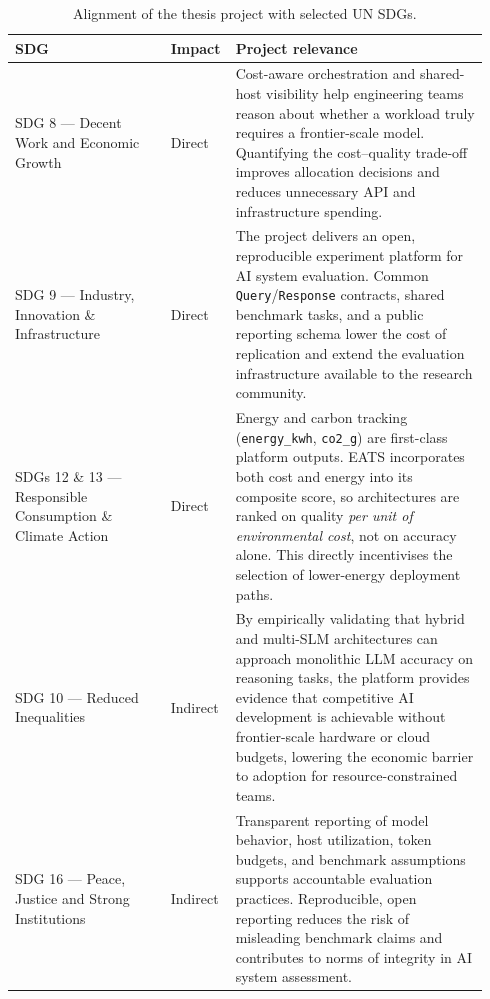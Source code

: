 \begin{table}[htbp]
    \centering
    \caption{Alignment of the thesis project with selected UN SDGs.}
    \small
    \renewcommand{\arraystretch}{1.12}
    \begin{tabularx}{\linewidth}{@{} >{\raggedright\arraybackslash}p{0.32\linewidth} >{\raggedright\arraybackslash}p{0.10\linewidth} >{\raggedright\arraybackslash}p{0.52\linewidth} @{}}
        \toprule
        \textbf{SDG} & \textbf{Impact} & \textbf{Project relevance} \\
        \midrule
        SDG 8 --- Decent Work and Economic Growth
            & Direct
            & Cost-aware orchestration and shared-host visibility help engineering teams reason
              about whether a workload truly requires a frontier-scale model.
              Quantifying the cost--quality trade-off improves allocation decisions and reduces
              unnecessary API and infrastructure spending. \\
        \addlinespace
        SDG 9 --- Industry, Innovation \& Infrastructure
            & Direct
            & The project delivers an open, reproducible experiment platform for AI system evaluation.
              Common \texttt{Query}/\texttt{Response} contracts, shared benchmark tasks, and a
              public reporting schema lower the cost of replication and extend the evaluation
              infrastructure available to the research community. \\
        \addlinespace
        SDGs 12 \& 13 --- Responsible Consumption \& Climate Action
            & Direct
            & Energy and carbon tracking (\texttt{energy\_kwh}, \texttt{co2\_g}) are first-class
              platform outputs.
              EATS incorporates both cost and energy into its composite score, so architectures
              are ranked on quality \emph{per unit of environmental cost}, not on accuracy alone.
              This directly incentivises the selection of lower-energy deployment paths. \\
        \addlinespace
        SDG 10 --- Reduced Inequalities
            & Indirect
            & By empirically validating that hybrid and multi-SLM architectures can approach
              monolithic LLM accuracy on reasoning tasks, the platform provides evidence that
              competitive AI development is achievable without frontier-scale hardware or cloud
              budgets, lowering the economic barrier to adoption for resource-constrained teams. \\
        \addlinespace
        SDG 16 --- Peace, Justice and Strong Institutions
            & Indirect
            & Transparent reporting of model behavior, host utilization, token budgets, and
              benchmark assumptions supports accountable evaluation practices.
              Reproducible, open reporting reduces the risk of misleading benchmark claims and
              contributes to norms of integrity in AI system assessment. \\
        \bottomrule
    \end{tabularx}
\end{table}


